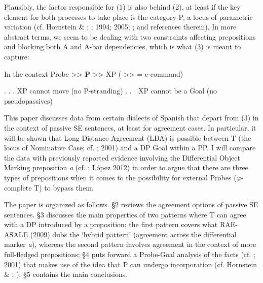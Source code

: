 \documentclass[output=paper]{langsci/langscibook}
\begin{document}
    \z
{}

Plausibly, the factor responsible for (1) is also behind (2), at least if the key element for both processes to take place is the category P, a locus of parametric variation (cf. Hornstein \& \citealt{Weinberg1981}; \citealt{Kayne1984}; 1994; 2005; \citealt{Abels2003}; and references therein). In more abstract terms, we seem to be dealing with two constraints affecting prepositions and blocking both A and A-bar dependencies, which is what (3) is meant to capture:

\ea%
    \label{ex:key:3}
     In the context Probe >>  \textbf{P}  >>  XP  ( >> = c-command)\\
     \begin{xlisti}\setcounter{xnumii}{1}
     \ex . . . XP cannot move (no P-stranding)
     \ex . . . XP cannot be a Goal (no pseudopassives)
     \end{xlisti}
\z

This paper discusses data from certain dialects of Spanish that depart from (3) in the context of passive SE sentences, at least for agreement cases. In particular, it will be shown that Long Distance Agreement (LDA) is possible between T (the locus of Nominative Case; cf. \citealt{Chomsky2000}; 2001) and a DP Goal within a PP. I will compare the data with previously reported evidence involving the Differential Object Marking preposition \textit{a} (cf. \citealt{Torrego1998}; López 2012) in order to argue that there are three types of prepositions when it comes to the possibility for external Probes ($\varphi $-complete T) to bypass them.

The paper is organized as follows. §2 reviews the agreement options of passive SE sentences. §3 discusses the main properties of two patterns where T can agree with a DP introduced by a preposition; the first pattern covers what RAE-ASALE (2009) dubs the ‘hybrid pattern’ (agreement across the differential marker \textit{a}), whereas the second pattern involves agreement in the context of more full-fledged prepositions; §4 puts forward a Probe-Goal analysis of the facts (cf. \citealt{Chomsky2000}; 2001) that makes use of the idea that P can undergo incorporation (cf. Hornstein \& \citealt{Weinberg1981}; \citealt{Law2006}). §5 contains the main conclusions.
\end{document}
